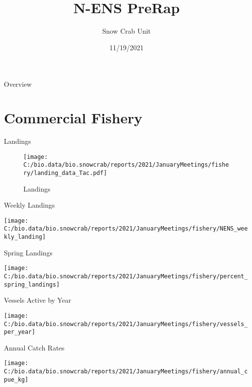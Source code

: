 \documentclass[
  ignorenonframetext,
]{beamer}
\title{N-ENS PreRap}
\author{Snow Crab Unit}
\date{11/19/2021}
\begin{document}
\frame{\titlepage}

\begin{frame}{Overview}
\protect\hypertarget{overview}{}
\end{frame}

\hypertarget{commercial-fishery}{%
\section{Commercial Fishery}\label{commercial-fishery}}

\begin{frame}{Landings}
\protect\hypertarget{landings}{}
\begin{figure}
\centering
\texttt{[image: C:/bio.data/bio.snowcrab/reports/2021/JanuaryMeetings/fishery/landing\_data\_Tac.pdf]}
\caption{Landings}
\end{figure}
\end{frame}

\begin{frame}{Weekly Landings}
\protect\hypertarget{weekly-landings}{}
\begin{center}\texttt{[image: C:/bio.data/bio.snowcrab/reports/2021/JanuaryMeetings/fishery/NENS\_weekly\_landing]} \end{center}
\end{frame}

\begin{frame}{Spring Landings}
\protect\hypertarget{spring-landings}{}
\begin{center}\texttt{[image: C:/bio.data/bio.snowcrab/reports/2021/JanuaryMeetings/fishery/percent\_spring\_landings]} \end{center}
\end{frame}

\begin{frame}{Vessels Active by Year}
\protect\hypertarget{vessels-active-by-year}{}
\begin{center}\texttt{[image: C:/bio.data/bio.snowcrab/reports/2021/JanuaryMeetings/fishery/vessels\_per\_year]} \end{center}
\end{frame}

\begin{frame}{Annual Catch Rates}
\protect\hypertarget{annual-catch-rates}{}
\begin{center}\texttt{[image: C:/bio.data/bio.snowcrab/reports/2021/JanuaryMeetings/fishery/annual\_cpue\_kg]} \end{center}
\end{frame}
\end{document}
